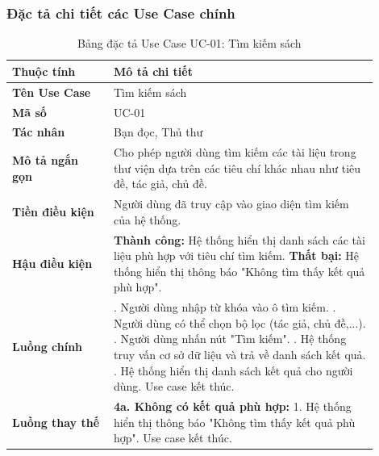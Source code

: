 \subsubsection{Đặc tả chi tiết các Use Case chính}
\begin{table}[H]
\centering
\caption{Bảng đặc tả Use Case UC-01: Tìm kiếm sách}
\label{tab:dt_tim_kiem_sach}
\begin{tabular}{|>{\raggedright\arraybackslash}p{0.25\linewidth}|>{\raggedright\arraybackslash}p{0.65\linewidth}|}
\hline
\textbf{Thuộc tính} & \textbf{Mô tả chi tiết} \\
\hline
\textbf{Tên Use Case} & Tìm kiếm sách \\
\hline
\textbf{Mã số} & UC-01 \\
\hline
\textbf{Tác nhân} & Bạn đọc, Thủ thư \\
\hline
\textbf{Mô tả ngắn gọn} & Cho phép người dùng tìm kiếm các tài liệu trong thư viện dựa trên các tiêu chí khác nhau như tiêu đề, tác giả, chủ đề. \\
\hline
\textbf{Tiền điều kiện} & Người dùng đã truy cập vào giao diện tìm kiếm của hệ thống. \\
\hline
\textbf{Hậu điều kiện} & \textbf{Thành công:} Hệ thống hiển thị danh sách các tài liệu phù hợp với tiêu chí tìm kiếm. \newline \textbf{Thất bại:} Hệ thống hiển thị thông báo "Không tìm thấy kết quả phù hợp". \\
\hline
\textbf{Luồng chính} &
1. Người dùng nhập từ khóa vào ô tìm kiếm. \newline
2. Người dùng có thể chọn bộ lọc (tác giả, chủ đề,...). \newline
3. Người dùng nhấn nút "Tìm kiếm". \newline
4. Hệ thống truy vấn cơ sở dữ liệu và trả về danh sách kết quả. \newline
5. Hệ thống hiển thị danh sách kết quả cho người dùng. Use case kết thúc. \\
\hline
\textbf{Luồng thay thế} &
\textbf{4a. Không có kết quả phù hợp:} \newline
\hspace{1em} 1. Hệ thống hiển thị thông báo "Không tìm thấy kết quả phù hợp". Use case kết thúc. \\
\hline
\end{tabular}
\end{table}

